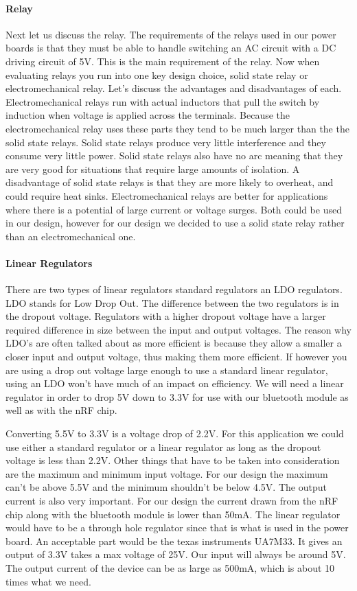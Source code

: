 \paragraph{Relay}
Next let us discuss the relay. The requirements of the relays used in our power
boards is that they must be able to handle switching an AC circuit with a DC
driving circuit of 5V. This is the main requirement of the relay. Now when
evaluating relays you run into one key design choice, solid state relay or
electromechanical relay. Let{}'s discuss the advantages and disadvantages of
each. Electromechanical relays run with actual inductors that pull the switch
by induction when voltage is applied across the terminals. Because the
electromechanical relay uses these parts they tend to be much larger than the
the solid state relays. Solid state relays produce very little interference and
they consume very little power. Solid state relays also have no arc meaning
that they are very good for situations that require large amounts of isolation.
A disadvantage of solid state relays is that they are more likely to overheat,
and could require heat sinks. Electromechanical relays are better for
applications where there is a potential of large current or voltage surges.
Both could be used in our design, however for our design we decided to use a
solid state relay rather than an electromechanical one.
\cite{link8}

\paragraph{Linear Regulators}
There are two types of linear regulators standard regulators an LDO regulators.
LDO stands for Low Drop Out. The difference between the two regulators is in
the dropout voltage. Regulators with a higher dropout voltage have a larger
required difference in size between the input and output voltages. The reason
why LDO{}'s are often talked about as more efficient is because they allow a
smaller a closer input and output voltage, thus making them more efficient. If
however you are using a drop out voltage large enough to use a standard linear
regulator, using an LDO won{}'t have much of an impact on efficiency. We will
need a linear regulator in order to drop 5V down to 3.3V for use with our
bluetooth module as well as with the nRF chip.
\cite{link9}

Converting 5.5V to 3.3V is a voltage drop of 2.2V. For this application we
could use either a standard regulator or a linear regulator as long as the
dropout voltage is less than 2.2V. Other things that have to be taken into
consideration are the maximum and minimum input voltage. For our design the
maximum can{}'t be above 5.5V and the minimum shouldn{}'t be below 4.5V. The
output current is also very important. For our design the current drawn from
the nRF chip along with the bluetooth module is lower than 50mA. The linear
regulator would have to be a through hole regulator since that is what is used
in the power board. An acceptable part would be the texas instruments UA7M33.
It gives an output of 3.3V takes a max voltage of 25V. Our input will always be
around 5V. The output current of the device can be as large as 500mA, which is
about 10 times what we need.

